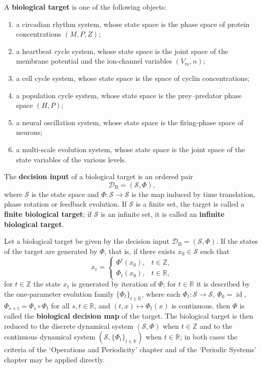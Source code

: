 \begin{definition}\label{def:bio_target}
A \textbf{biological target} is one of the following objects:
\begin{enumerate}[label=(\roman*)]
    \item a circadian rhythm system, whose state space is the phase space of protein concentrations $(M,P,Z)$;
    \item a heartbeat cycle system, whose state space is the joint space of the membrane potential and the ion-channel variables $(V_m,n)$;
    \item a cell cycle system, whose state space is the space of cyclin concentrations;
    \item a population cycle system, whose state space is the prey--predator phase space $(H,P)$;
    \item a neural oscillation system, whose state space is the firing-phase space of neurons;
    \item a multi-scale evolution system, whose state space is the joint space of the state variables of the various levels.
\end{enumerate}
The \textbf{decision input} of a biological target is an ordered pair
\[
\mathcal D_{\mathrm{B}}=(\mathcal S,\Phi),
\]
where $\mathcal S$ is the state space and $\Phi:\mathcal S\to\mathcal S$ is the map induced by time translation, phase rotation or feedback evolution. If $\mathcal S$ is a finite set, the target is called a \textbf{finite biological target}; if $\mathcal S$ is an infinite set, it is called an \textbf{infinite biological target}.
\end{definition}

\begin{definition}\label{def:bio_periodization}
Let a biological target be given by the decision input $\mathcal D_{\mathrm{B}}=(\mathcal S,\Phi)$. If the states of the target are generated by $\Phi$, that is, if there exists $x_0\in\mathcal S$ such that
\[
x_t=\begin{cases}\Phi^t(x_0), & t\in\mathbb Z,\\ \Phi_t(x_0), & t\in\mathbb R,\end{cases}
\]
for $t\in\mathbb Z$ the state $x_t$ is generated by iteration of $\Phi$; for $t\in\mathbb R$ it is described by the one-parameter evolution family $\{\Phi_t\}_{t\in\mathbb R}$, where each $\Phi_t:\mathcal S\to\mathcal S$, $\Phi_0=\operatorname{id}$, $\Phi_{s+t}=\Phi_s\circ\Phi_t$ for all $s,t\in\mathbb R$, and $(t,x)\mapsto\Phi_t(x)$ is continuous.
then $\Phi$ is called the \textbf{biological decision map} of the target. The biological target is then reduced to the discrete dynamical system $(\mathcal S,\Phi)$ when $t\in\mathbb Z$ and to the continuous dynamical system $(\mathcal S,\{\Phi_t\}_{t\in\mathbb R})$ when $t\in\mathbb R$; in both cases the criteria of the `Operations and Periodicity' chapter and of the `Periodic Systems' chapter may be applied directly.
\end{definition}

